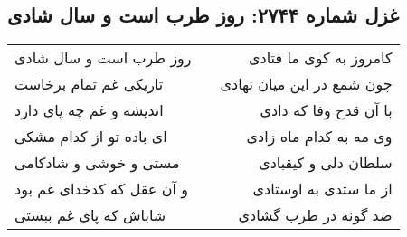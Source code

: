 \begin{center}
\section*{غزل شماره ۲۷۴۴: روز طرب است و سال شادی}
\label{sec:2744}
\begin{longtable}{l p{0.5cm} r}
روز طرب است و سال شادی
&&
کامروز به کوی ما فتادی
\\
تاریکی غم تمام برخاست
&&
چون شمع در این میان نهادی
\\
اندیشه و غم چه پای دارد
&&
با آن قدح وفا که دادی
\\
ای باده تو از کدام مشکی
&&
وی مه به کدام ماه زادی
\\
مستی و خوشی و شادکامی
&&
سلطان دلی و کیقبادی
\\
و آن عقل که کدخدای غم بود
&&
از ما ستدی به اوستادی
\\
شاباش که پای غم ببستی
&&
صد گونه در طرب گشادی
\\
\end{longtable}
\end{center}

